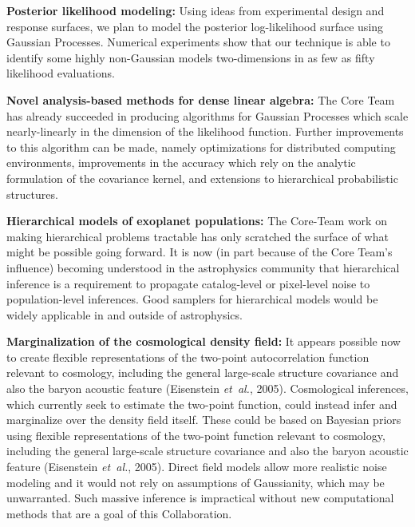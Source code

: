 \documentclass[12pt]{article}
\newcommand{\foreign}[1]{\textsl{#1}}
\newcommand{\etal}{\foreign{et~al.}}
\begin{document}

\textbf{Posterior likelihood modeling:}
Using ideas from experimental design and response surfaces, we plan to 
model the posterior log-likelihood surface using
Gaussian Processes.
Numerical experiments show that our technique is able to
identify some highly non-Gaussian models two-dimensions in as few as
fifty likelihood evaluations.

\textbf{Novel analysis-based methods for dense linear algebra:}
The Core Team has already succeeded in producing algorithms for Gaussian
Processes which scale nearly-linearly in the dimension of the likelihood
function.
Further improvements to this algorithm can be made, namely optimizations
for distributed computing environments, improvements in the accuracy
which rely on the analytic formulation of the covariance kernel, and
extensions to hierarchical probabilistic structures.

\textbf{Hierarchical models of exoplanet populations:}
The Core-Team work on making hierarchical problems tractable has
only scratched the surface of what might be possible going forward.
It is now (in part because of the Core Team's influence) becoming
understood in the astrophysics community that hierarchical inference
is a requirement to propagate catalog-level or pixel-level noise to
population-level inferences.
Good samplers for hierarchical models would be widely applicable in
and outside of astrophysics.



\textbf{Marginalization of the cosmological density field:} 
It appears possible now to create flexible representations of the
two-point autocorrelation function relevant to cosmology, including
the general large-scale structure covariance and also the baryon
acoustic feature (Eisenstein \etal, 2005).
Cosmological inferences, which currently seek to estimate the two-point 
function, could instead infer and marginalize over the density field itself.
These could be based on Bayesian priors using flexible representations of the
two-point function relevant to cosmology, including
the general large-scale structure covariance and also the baryon
acoustic feature (Eisenstein \etal, 2005).
Direct field models allow more realistic noise modeling and it would not rely
on assumptions of Gaussianity, which may be unwarranted.
Such massive inference is impractical without new computational methods
that are a goal of this Collaboration.
\end{document}
